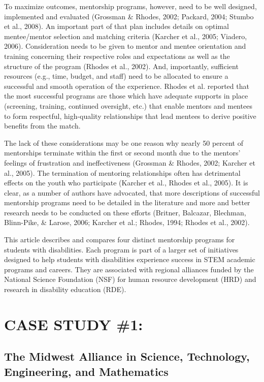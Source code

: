 \documentclass[11.5pt]{sig-alternate} %
\begin{document}
\begin{large}
To maximize outcomes, mentorship programs, however, need to be well designed, implemented and evaluated (Grossman \& Rhodes, 2002; Pack\-ard, 2004; Stumbo et al., 2008). An important part of that plan includes details on optimal mentee/mentor selection and matching criteria (Karcher et al., 2005; Viadero, 2006). Consideration needs to be given to mentor and mentee orientation and training concerning their respective roles and expectations as well as the structure of the program (Rhodes et al., 2002). And, importantly, sufficient resources (e.g., time, budget, and staff) need to be allocated to ensure a successful and smooth operation of the experience. Rhodes et al. reported that the most successful programs are those which have adequate supports in place (screening, training, continued oversight, etc.) that enable mentors and mentees to form respectful, high-quality relationships that lead mentees to derive positive benefits from the match.

The lack of these considerations may be one reason why nearly 50 percent of mentorships terminate within the first or second month due to the mentors' feelings of frustration and ineffectiveness (Grossman \& Rhodes, 2002; Karcher et al., 2005). The termination of mentoring relationships often has detrimental effects on the youth who participate (Karcher et al., Rhodes et al., 2005). It is clear, as a number of authors have advocated, that more descriptions of successful mentorship programs need to be detailed in the literature and more and better research needs to be conducted on these efforts (Britner, Balcazar, Blechman, Blinn-Pike, \& Larose, 2006; Karcher et al.; Rhodes, 1994; Rhodes et al., 2002).
 
This article describes and compares four distinct mentorship programs for students with disabilities. Each program is part of a larger set of initiatives designed to help students with disabilities experience success in STEM academic programs and careers. They are associated with regional alliances funded by the National Science Foundation (NSF) for human resource development (HRD) and research in disability education (RDE).

\section*{CASE STUDY \#1:}
\subsection*{The Midwest Alliance in Science, Technology, Engineering, and Mathematics}

\end{large}
\end{document}
